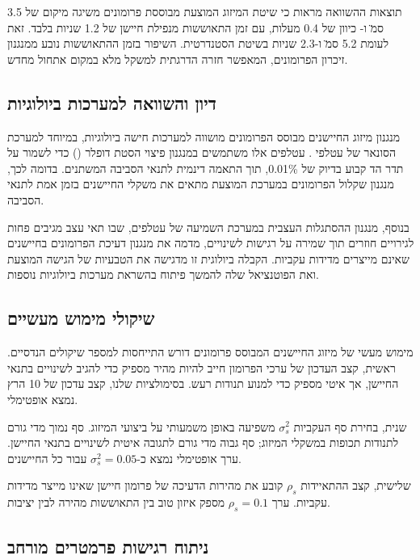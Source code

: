 תוצאות ההשוואה מראות כי שיטת המיזוג המוצעת מבוססת פרומונים משיגה  מיקום של 3.5 ס\"מ ו- כיוון של 0.4 מעלות, עם זמן התאוששות מנפילת חיישן של 1.2 שניות בלבד. זאת לעומת 5.2 ס\"מ ו-2.3 שניות בשיטת  הסטנדרטית. השיפור בזמן ההתאוששות נובע ממנגנון זיכרון הפרומונים, המאפשר חזרה הדרגתית למשקל מלא במקום אתחול מחדש.

\subsection{דיון והשוואה למערכות ביולוגיות}
\label{sec:bio_comparison}

מנגנון מיזוג החיישנים מבוסס הפרומונים מושווה למערכות חישה ביולוגיות, במיוחד למערכת הסונאר של עטלפי . עטלפים אלו משתמשים במנגנון פיצוי הסטת דופלר () כדי לשמור על תדר הד קבוע בדיוק של 0.01\%, תוך התאמה דינמית לתנאי הסביבה המשתנים. בדומה לכך, מנגנון שקלול הפרומונים במערכת המוצעת מתאים את משקלי החיישנים בזמן אמת לתנאי הסביבה.

בנוסף, מנגנון ההסתגלות העצבית במערכת השמיעה של עטלפים, שבו תאי עצב מגיבים פחות לגירויים חוזרים תוך שמירה על רגישות לשינויים, מדמה את מנגנון דעיכת הפרומונים בחיישנים שאינם מייצרים מדידות עקביות. הקבלה ביולוגית זו מדגישה את הטבעיות של הגישה המוצעת ואת הפוטנציאל שלה להמשך פיתוח בהשראת מערכות ביולוגיות נוספות.

\subsection{שיקולי מימוש מעשיים}
\label{sec:ch03_implementation}

מימוש מעשי של מיזוג החיישנים המבוסס פרומונים דורש התייחסות למספר שיקולים הנדסיים. ראשית, קצב העדכון של ערכי הפרומון חייב להיות מהיר מספיק כדי להגיב לשינויים בתנאי החיישן, אך איטי מספיק כדי למנוע תנודות רעש. בסימולציות שלנו, קצב עדכון של 10 הרץ נמצא אופטימלי.

שנית, בחירת סף העקביות $\sigma_{s}^{2}$ משפיעה באופן משמעותי על ביצועי המיזוג. סף נמוך מדי גורם לתנודות תכופות במשקלי המיזוג; סף גבוה מדי גורם לתגובה איטית לשינויים בתנאי החיישן. ערך אופטימלי נמצא כ-$\sigma_{s}^{2} = 0.05$ עבור כל החיישנים.

שלישית, קצב ההתאיידות $\rho_{s}$ קובע את מהירות הדעיכה של פרומון חיישן שאינו מייצר מדידות עקביות. ערך $\rho_{s} = 0.1$ מספק איזון טוב בין התאוששות מהירה לבין יציבות.

\subsection{ניתוח רגישות פרמטרים מורחב}
\label{sec:ch03_sensitivity}

